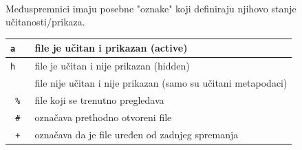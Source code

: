 \documentclass[10pt]{article}
\begin{document}
    \\
    Međuspremnici imaju posebne "oznake" koji definiraju njihovo stanje učitanosti/prikaza.
    \\
    \begin{tabular}{|>{\tt}p{9.00cm}|>{}p{15.50cm}|}
        \hline
        a                                           & file je učitan i prikazan (active)                                            \\ \hline 
        h                                           & file je učitan i nije prikazan (hidden)                                       \\ \hline                                  
                                                    & file nije učitan i nije prikazan (samo su učitani metapodaci)                 \\ \hline
        \%                                          & file koji se trenutno pregledava                                              \\ \hline
        \#                                          & označava prethodno otvoreni file                                              \\ \hline
        +                                           & označava da je file uređen od zadnjeg spremanja                               \\ \hline
    \end{tabular}         
    \newpage              
    
\end{document}
